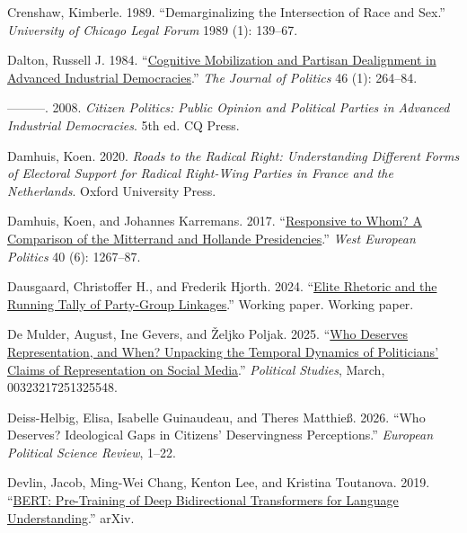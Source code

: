 \documentclass[12pt]{article}
\begin{document}
\begin{CSLReferences}{1}{0}
Crenshaw, Kimberle. 1989. {``Demarginalizing the Intersection of Race and Sex.''} \emph{University of Chicago Legal Forum} 1989 (1): 139--67.

Dalton, Russell J. 1984. {``\href{https://doi.org/10.2307/2130444}{Cognitive Mobilization and Partisan Dealignment in Advanced Industrial Democracies}.''} \emph{The Journal of Politics} 46 (1): 264--84.

---------. 2008. \emph{Citizen Politics: Public Opinion and Political Parties in Advanced Industrial Democracies}. 5th ed. {CQ} Press.

Damhuis, Koen. 2020. \emph{Roads to the Radical Right: Understanding Different Forms of Electoral Support for Radical Right-Wing Parties in France and the Netherlands}. Oxford University Press.

Damhuis, Koen, and Johannes Karremans. 2017. {``\href{https://doi.org/10.1080/01402382.2017.1300472}{Responsive to Whom? A Comparison of the Mitterrand and Hollande Presidencies}.''} \emph{West European Politics} 40 (6): 1267--87.

Dausgaard, Christoffer H., and Frederik Hjorth. 2024. {``\href{https://fghjorth.github.io/workingpapers/runningtally.pdf}{Elite Rhetoric and the Running Tally of Party-Group Linkages}.''} Working paper. Working paper.

De Mulder, August, Ine Gevers, and Željko Poljak. 2025. {``\href{https://doi.org/10.1177/00323217251325548}{Who Deserves Representation, and When? Unpacking the Temporal Dynamics of Politicians' Claims of Representation on Social Media}.''} \emph{Political Studies}, March, 00323217251325548.

Deiss-Helbig, Elisa, Isabelle Guinaudeau, and Theres Matthieß. 2026. {``Who Deserves? Ideological Gaps in Citizens' Deservingness Perceptions.''} \emph{European Political Science Review}, 1--22.

Devlin, Jacob, Ming-Wei Chang, Kenton Lee, and Kristina Toutanova. 2019. {``\href{https://doi.org/10.48550/arXiv.1810.04805}{{BERT}: Pre-Training of Deep Bidirectional Transformers for Language Understanding}.''} {arXiv}.


\end{CSLReferences}
\end{document}
